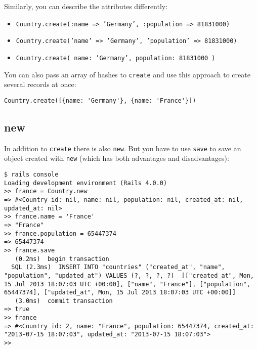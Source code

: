 \documentclass[a4paper]{book}
\begin{document}
Similarly, you can describe the attributes differently:

\begin{itemize}
\itemsep1pt\parskip0pt
\item
  \texttt{Country.create(:name =\textgreater{} 'Germany', :population             =\textgreater{} 81831000)}
\item
  \texttt{Country.create('name' =\textgreater{} 'Germany', 'population'             =\textgreater{} 81831000)}
\item
  \texttt{Country.create( name: 'Germany', population: 81831000             )}
\end{itemize}

You can also pass an array of hashes to \texttt{create} and use this approach to create several records at once:

\begin{shaded}\begin{verbatim}
Country.create([{name: 'Germany'}, {name: 'France'}])
\end{verbatim}\end{shaded}

\subsection{new}\label{new}

In addition to \texttt{create} there is also \texttt{new}. But you have to use \texttt{save} to save an object created with \texttt{new} (which has both advantages and disadvantages):

\begin{shaded}\begin{verbatim}
$ rails console
Loading development environment (Rails 4.0.0)
>> france = Country.new
=> #<Country id: nil, name: nil, population: nil, created_at: nil, updated_at: nil>
>> france.name = 'France'
=> "France"
>> france.population = 65447374
=> 65447374
>> france.save
   (0.2ms)  begin transaction
  SQL (2.3ms)  INSERT INTO "countries" ("created_at", "name", "population", "updated_at") VALUES (?, ?, ?, ?)  [["created_at", Mon, 15 Jul 2013 18:07:03 UTC +00:00], ["name", "France"], ["population", 65447374], ["updated_at", Mon, 15 Jul 2013 18:07:03 UTC +00:00]]
   (3.0ms)  commit transaction
=> true
>> france
=> #<Country id: 2, name: "France", population: 65447374, created_at: "2013-07-15 18:07:03", updated_at: "2013-07-15 18:07:03">
>>
\end{verbatim}\end{shaded}
\end{document}
